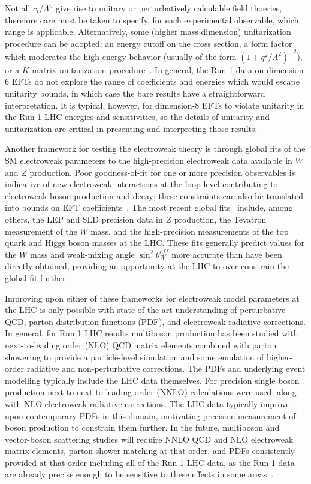 Not all $c_i/\Lambda^n$ give rise to unitary or perturbatively
calculable field thoeries, therefore care must be taken to specify,
for each experimental observable, which range is applicable.
Alternatively, some (higher mass dimension) unitarization procedure
can be adopted: an energy cutoff on the cross section, a form factor
which moderates the high-energy behavior (usually of the form
$(1+q^2/\Lambda^2)^{-2}$), or a $K$-matrix unitarization
procedure~\cite{Alboteanu:2008my,Chung:1995dx}.  In general, the Run 1
data on dimension-6 EFTs do not explore the range of coefficients and
energies which would escape unitarity bounds, in which case the bare
results have a straightforward interpretation.  It is typical,
however, for dimension-8 EFTs to violate unitarity in the Run 1 LHC
energies and sensitivities, so the details of unitarity and
unitarization are critical in presenting and interpreting those
results.

Another framework for testing the electroweak theory is through global
fits of the SM electroweak parameters to the high-precision
electroweak data available in $W$ and $Z$ production.  Poor
goodness-of-fit for one or more precision observables is indicative of
new electroweak interactions at the loop level contributing to
electroweak boson production and decay; these constraints can also be
translated into bounds on EFT coefficients~\cite{Falkowski:2014tna}.
The most recent global fits~\cite{Baak:2014ora,Ciuchini:2013pca}
include, among others, the LEP and SLD precision data in $Z$
production, the Tevatron measurement of the $W$ mass, and the
high-precision measurements of the top quark and Higgs boson masses at
the LHC.  These fits generally predict values for the $W$ mass and
weak-mixing angle $\sin^2\theta^{eff}_{W}$ more accurate than have
been directly obtained, providing an opportunity at the LHC to
over-constrain the global fit further.

Improving upon either of these frameworks for electroweak model
parameters at the LHC is only possible with state-of-the-art
understanding of perturbative QCD, parton distribution functions
(PDF), and electroweak radiative corrections.  In general, for Run 1
LHC results multiboson production has been studied with
next-to-leading order (NLO) QCD matrix elements combined with parton
showering to provide a particle-level simulation and some emulation of
higher-order radiative and non-perturbative corrections. The PDFs and
underlying event modelling typically include the LHC data themselves.
For precision single boson production next-to-next-to-leading order
(NNLO) calculations were used, along with NLO electroweak radiative
corrections.  The LHC data typically improve upon contemporary PDFs in
this domain, motivating precision measurement of boson production to
constrain them further.  In the future, multiboson and vector-boson
scattering studies will require NNLO QCD and NLO electroweak matrix
elements, parton-shower matching at that order, and PDFs consistently
provided at that order including all of the Run 1 LHC data, as the Run
1 data are already precise enough to be sensitive to these effects in
some areas~\cite{Badger:2016bpw}.
